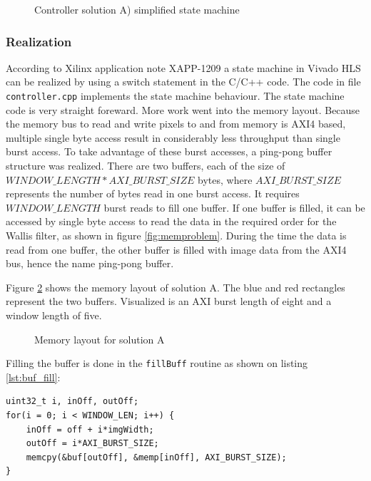 \begin{figure}[H]
    \centering
    \begin{adjustbox}{scale=1}
        
    \end{adjustbox}
    \caption{Controller solution A) simplified state machine}
    \label{fig:controllerfsm}
\end{figure}

\subsubsection*{Realization}
According to Xilinx application note XAPP-1209 \cite{xapp1209} a state
machine in Vivado HLS can be realized by using a switch statement in the C/C++
code.
The code in file \texttt{controller.cpp} implements the state machine behaviour.
The state machine code is very straight foreward. More work went into the memory
layout. Because the memory bus to read and write pixels to and from memory is
AXI4 based, multiple single byte access result in considerably less throughput
than single burst access.
To take advantage of these burst accesses, a ping-pong buffer structure was
realized. There are two buffers, each of the size of $WINDOW\_LENGTH *
AXI\_BURST\_SIZE$ bytes, where $AXI\_BURST\_SIZE$ represents the number of bytes
read
in one burst access. It requires $WINDOW\_LENGTH$ burst reads to fill one
buffer. If one buffer is filled, it can be accessed by single byte access to
read the data in the required order for the Wallis filter, as shown in figure
\ref{fig:memproblem}. During the time the data is read from one buffer, the
other buffer is filled with image data from the AXI4 bus, hence the name
ping-pong buffer. 

Figure \ref{fig:solamemlayout} shows the memory layout of
solution A. The blue and red rectangles represent the two buffers. Visualized is
an AXI burst length of eight and a window length of five.

\begin{figure}[tb!]
    \centering
    \begin{adjustbox}{scale=0.7}
        
    \end{adjustbox}
    \caption{Memory layout for solution A}
    \label{fig:solamemlayout}
\end{figure}

Filling the buffer is done in the \texttt{fillBuff} routine
as shown on listing \ref{lst:buf_fill}:

\begin{minipage}{\textwidth}
\begin{lstlisting}[style=CStyle, caption=Buffer fill simplified,
label=lst:buf_fill]
uint32_t i, inOff, outOff;
for(i = 0; i < WINDOW_LEN; i++) {
    inOff = off + i*imgWidth;
    outOff = i*AXI_BURST_SIZE;
    memcpy(&buf[outOff], &memp[inOff], AXI_BURST_SIZE);
}\end{lstlisting}
\end{minipage}

